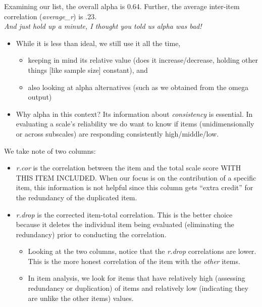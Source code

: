 \documentclass[
  english,
]{book}
\providecommand{\tightlist}{%
  \setlength{\itemsep}{0pt}\setlength{\parskip}{0pt}}
\begin{document}
Examining our list, the overall alpha is 0.64. Further, the average inter-item correlation (\emph{average\_r}) is .23.\\
\emph{And just hold up a minute, I thought you told us alpha was bad!}

\begin{itemize}
\tightlist
\item
  While it is less than ideal, we still use it all the time,

  \begin{itemize}
  \tightlist
  \item
    keeping in mind its relative value (does it increase/decrease, holding other things {[}like sample size{]} constant), and
  \item
    also looking at alpha alternatives (such as we obtained from the omega output)
  \end{itemize}
\item
  Why alpha in this context? Its information about \emph{consistency} is essential. In evaluating a scale's reliability we do want to know if items (unidimensionally or across subscales) are responding consistently high/middle/low.
\end{itemize}

We take note of two columns:

\begin{itemize}
\tightlist
\item
  \emph{r.cor} is the correlation between the item and the total scale score WITH THIS ITEM INCLUDED. When our focus is on the contribution of a specific item, this information is not helpful since this column gets ``extra credit'' for the redundancy of the duplicated item.
\item
  \emph{r.drop} is the corrected item-total correlation. This is the better choice because it deletes the individual item being evaluated (eliminating the redundancy) prior to conducting the correlation.

  \begin{itemize}
  \tightlist
  \item
    Looking at the two columns, notice that the \emph{r.drop} correlations are lower. This is the more honest correlation of the item with the \emph{other} items.
  \item
    In item analysis, we look for items that have relatively high (assessing redundancy or duplication) of items and relatively low (indicating they are unlike the other items) values.
  \end{itemize}
\end{itemize}
\end{document}
